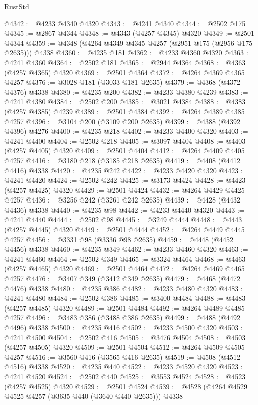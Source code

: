 \begin{lexlean}{RustStd}
\begin{coremodule}
@4342 := @4233 @4340 @4320
@4343 := @4241 @4340
@4344 := @2502 @175
@4345 := @2867 @4344
@4348 := @4343 (@4257 @4345) @4320
@4349 := @2501 @4344
@4359 := @4348 (@4264 @4349 @4345 @4257 (@2951 @175 (@2956 @175 @2635))) @4338
@4360 := @4235 @181
@4362 := @4233 @4360 @4320
@4363 := @4241 @4360
@4364 := @2502 @181
@4365 := @2944 @4364
@4368 := @4363 (@4257 @4365) @4320
@4369 := @2501 @4364
@4372 := @4264 @4369 @4365 @4257
@4376 := @3028 @181 (@3033 @181 @2635)
@4379 := @4368 (@4372 @4376) @4338
@4380 := @4235 @200
@4382 := @4233 @4380 @4239
@4383 := @4241 @4380
@4384 := @2502 @200
@4385 := @3021 @4384
@4388 := @4383 (@4257 @4385) @4239
@4389 := @2501 @4384
@4392 := @4264 @4389 @4385 @4257
@4396 := @3104 @200 (@3109 @200 @2635)
@4399 := @4388 (@4392 @4396) @4276
@4400 := @4235 @218
@4402 := @4233 @4400 @4320
@4403 := @4241 @4400
@4404 := @2502 @218
@4405 := @3097 @4404
@4408 := @4403 (@4257 @4405) @4320
@4409 := @2501 @4404
@4412 := @4264 @4409 @4405 @4257
@4416 := @3180 @218 (@3185 @218 @2635)
@4419 := @4408 (@4412 @4416) @4338
@4420 := @4235 @242
@4422 := @4233 @4420 @4320
@4423 := @4241 @4420
@4424 := @2502 @242
@4425 := @3173 @4424
@4428 := @4423 (@4257 @4425) @4320
@4429 := @2501 @4424
@4432 := @4264 @4429 @4425 @4257
@4436 := @3256 @242 (@3261 @242 @2635)
@4439 := @4428 (@4432 @4436) @4338
@4440 := @4235 @98
@4442 := @4233 @4440 @4320
@4443 := @4241 @4440
@4444 := @2502 @98
@4445 := @3249 @4444
@4448 := @4443 (@4257 @4445) @4320
@4449 := @2501 @4444
@4452 := @4264 @4449 @4445 @4257
@4456 := @3331 @98 (@3336 @98 @2635)
@4459 := @4448 (@4452 @4456) @4338
@4460 := @4235 @349
@4462 := @4233 @4460 @4320
@4463 := @4241 @4460
@4464 := @2502 @349
@4465 := @3324 @4464
@4468 := @4463 (@4257 @4465) @4320
@4469 := @2501 @4464
@4472 := @4264 @4469 @4465 @4257
@4476 := @3407 @349 (@3412 @349 @2635)
@4479 := @4468 (@4472 @4476) @4338
@4480 := @4235 @386
@4482 := @4233 @4480 @4320
@4483 := @4241 @4480
@4484 := @2502 @386
@4485 := @3400 @4484
@4488 := @4483 (@4257 @4485) @4320
@4489 := @2501 @4484
@4492 := @4264 @4489 @4485 @4257
@4496 := @3483 @386 (@3488 @386 @2635)
@4499 := @4488 (@4492 @4496) @4338
@4500 := @4235 @416
@4502 := @4233 @4500 @4320
@4503 := @4241 @4500
@4504 := @2502 @416
@4505 := @3476 @4504
@4508 := @4503 (@4257 @4505) @4320
@4509 := @2501 @4504
@4512 := @4264 @4509 @4505 @4257
@4516 := @3560 @416 (@3565 @416 @2635)
@4519 := @4508 (@4512 @4516) @4338
@4520 := @4235 @440
@4522 := @4233 @4520 @4320
@4523 := @4241 @4520
@4524 := @2502 @440
@4525 := @3553 @4524
@4528 := @4523 (@4257 @4525) @4320
@4529 := @2501 @4524
@4539 := @4528 (@4264 @4529 @4525 @4257 (@3635 @440 (@3640 @440 @2635))) @4338

\end{coremodule}
\end{lexlean}
